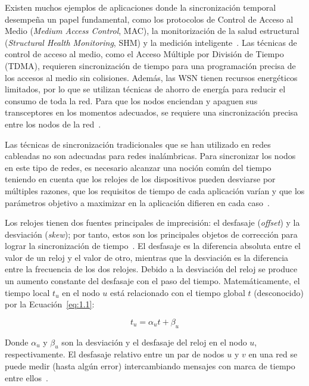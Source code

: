 Existen muchos ejemplos de aplicaciones donde la sincronización temporal desempeña un papel fundamental, como los protocolos de Control de Acceso al Medio (\textit{Medium Access Control}, MAC), la monitorización de la salud estructural (\textit{Structural Health Monitoring}, SHM) y la medición inteligente~\cite{idrees2020}. Las técnicas de control de acceso al medio, como el Acceso Múltiple por División de Tiempo (TDMA), requieren sincronización de tiempo para una programación precisa de los accesos al medio sin colisiones. Además, las WSN tienen recursos energéticos limitados, por lo que se utilizan técnicas de ahorro de energía para reducir el consumo de toda la red. Para que los nodos enciendan y apaguen sus transceptores en los momentos adecuados, se requiere una sincronización precisa entre los nodos de la red~\cite{lasassmeh2010}.

Las técnicas de sincronización tradicionales que se han utilizado en redes cableadas no son adecuadas para redes inalámbricas. Para sincronizar los nodos en este tipo de redes, es necesario alcanzar una noción común del tiempo teniendo en cuenta que los relojes de los dispositivos pueden desviarse por múltiples razones, que los requisitos de tiempo de cada aplicación varían y que los parámetros objetivo a maximizar en la aplicación difieren en cada caso~\cite{oliva2024}.

Los relojes tienen dos fuentes principales de imprecisión: el desfasaje (\textit{offset}) y la desviación (\textit{skew}); por tanto, estos son los principales objetos de corrección para lograr la sincronización de tiempo~\cite{krummacker2020}. El desfasaje es la diferencia absoluta entre el valor de un reloj y el valor de otro, mientras que la desviación es la diferencia entre la frecuencia de los dos relojes. Debido a la desviación del reloj se produce un aumento constante del desfasaje con el paso del tiempo. Matemáticamente, el tiempo local $t_u$ en el nodo $u$ está relacionado con el tiempo global $t$ (desconocido) por la Ecuación~\ref{eq:1.1}:

\begin{equation}
t_u = \alpha_u t + \beta_u
\label{eq:1.1}
\end{equation}

Donde $\alpha_u$ y $\beta_u$ son la desviación y el desfasaje del reloj en el nodo $u$, respectivamente. El desfasaje relativo entre un par de nodos $u$ y $v$ en una red se puede medir (hasta algún error) intercambiando mensajes con marca de tiempo entre ellos~\cite{barooah2007}.

